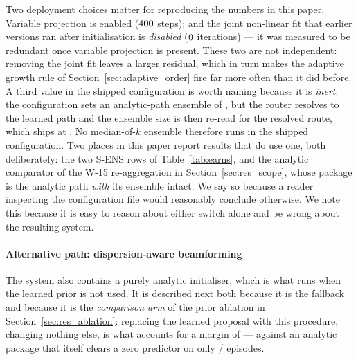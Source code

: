 \documentclass[review]{elsarticle}
\begin{document}
Two deployment choices matter for reproducing the numbers in this paper. Variable
projection is enabled ($400{}$ steps); and the joint non-linear fit that
earlier versions ran after initialisation is \emph{disabled} ($0{}$ iterations) --- it was measured to be
redundant once variable projection is present. These two are not independent:
removing the joint fit leaves a larger residual, which in turn makes the adaptive
growth rule of Section~\ref{sec:adaptive_order} fire far more often than it did
before.
A third value in the shipped configuration is worth naming because it is
\emph{inert}: the configuration sets an analytic-path ensemble of
\DepAnalyticEnsK{}, but the router resolves to the learned path and the ensemble
size is then re-read for the resolved route, which ships at \DepLearnedEnsK{}. No
median-of-$k$ ensemble therefore runs in the shipped configuration. Two places in
this paper report results that do use one, both deliberately: the two S-ENS rows of
Table~\ref{tab:earns}, and the analytic comparator of the W-15 re-aggregation in
Section~\ref{sec:res_scope}, whose package is the analytic path \emph{with} its
ensemble intact.
We say
so because a reader inspecting the configuration file would reasonably conclude
otherwise.
We note this because it is easy to reason about either switch alone and be
wrong about the resulting system.

\paragraph{Alternative path: dispersion-aware beamforming}
The system also contains a purely analytic initialiser, which is what runs when the
learned prior is not used. It is described next both because it is the fallback and
because it is the \emph{comparison arm} of the prior ablation in
Section~\ref{sec:res_ablation}: replacing the learned proposal with this procedure,
changing nothing else, is what accounts for a margin of \BTwentyTwoRel{} --- against an analytic
package that itself clears a zero predictor on only
\BTwentyTwoAnaZero{}/\BTwentyTwoN{} episodes.
\end{document}
